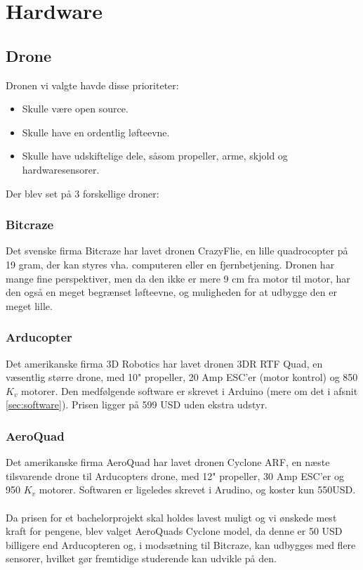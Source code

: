 \documentclass[Main]{subfiles}
\begin{document}
\chapter{Hardware}


\section{Drone}
Dronen vi valgte havde disse prioriteter:
\begin{itemize}
\item Skulle være open source.
\item Skulle have en ordentlig løfteevne.
\item Skulle have udskiftelige dele, såsom propeller, arme, skjold og hardwaresensorer.
\end{itemize}

Der blev set på 3 forskellige droner:
\subsection{Bitcraze}
Det svenske firma Bitcraze har lavet dronen CrazyFlie\cite{BitCraze}, en lille quadrocopter på 19 gram, der kan styres vha. computeren eller en fjernbetjening.
Dronen har mange fine perspektiver, men da den ikke er mere 9 cm fra motor til motor, har den også en meget begrænset løfteevne, og muligheden for at udbygge den er meget lille.

\subsection{Arducopter}
Det amerikanske firma 3D Robotics har lavet dronen 3DR RTF Quad\cite{ArduCopter}, en væsentlig større drone, med 10" propeller, 20 Amp ESC'er (motor kontrol) og 850 $K_v$\cite{Kv} motorer.
Den medfølgende software er skrevet i Arduino (mere om det i afsnit \ref{sec:software}). 
Prisen ligger på 599 USD uden ekstra udstyr.

\subsection{AeroQuad}
Det amerikanske firma AeroQuad har lavet dronen Cyclone ARF\cite{AQ-store}, en næste tilsvarende drone til Arducopters drone, med 12" propeller, 30 Amp ESC'er og 950 $K_v$\cite{Kv} motorer.
Softwaren er ligeledes skrevet i Arudino, og koster kun 550USD.
\\
\\
Da prisen for et bachelorprojekt skal holdes lavest muligt og vi ønskede mest kraft for pengene, blev valget AeroQuads Cyclone model, da denne er 50 USD billigere end Arducopteren og, i modsætning til Bitcraze, kan udbygges med flere sensorer, hvilket gør fremtidige studerende kan udvikle på den.
\end{document}
